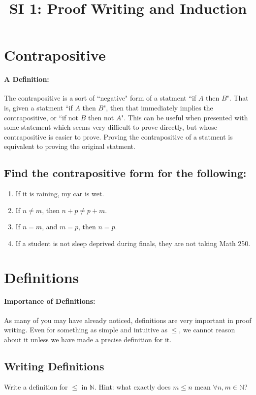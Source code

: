 \documentclass[12pt]{article}
\date{}
\author{}
\title{SI 1: Proof Writing and Induction}
\begin{document}
	\maketitle
	\section{Contrapositive}
	\paragraph{A Definition: } The contrapositive is a sort of ``negative" form of a statment ``if $A$ then $B$". That is, given a statment ``if $A$ then $B$", then that immediately implies the contrapositive, or ``if not $B$ then not $A$". This can be useful when presented with some statement which seems very difficult to prove directly, but whose contrapositive is easier to prove. Proving the contrapositive of a statment is equivalent to proving the original statment.
		\subsection{Find the contrapositive form for the following:}
		\begin{enumerate}
		\item If it is raining, my car is wet.
		\item If $n\neq m$, then $n+p\neq p+m$.
		\item If $n=m$, and $m=p$, then $n=p$.
		\item If a student is not sleep deprived during finals, they are not taking Math 250.
		\end{enumerate}
	\section{Definitions}
		\paragraph{Importance of Definitions: } As many of you may have already noticed, definitions are very important in proof writing. Even for something as simple and intuitive as $\leq$, we cannot reason about it unless we have made a precise definition for it.

		\subsection{Writing Definitions}
Write a definition for $\leq$ in $\mathbb{N}$. Hint: what exactly does $m\leq n$ mean $\forall n,m\in\mathbb{N}$?
\end{document}
